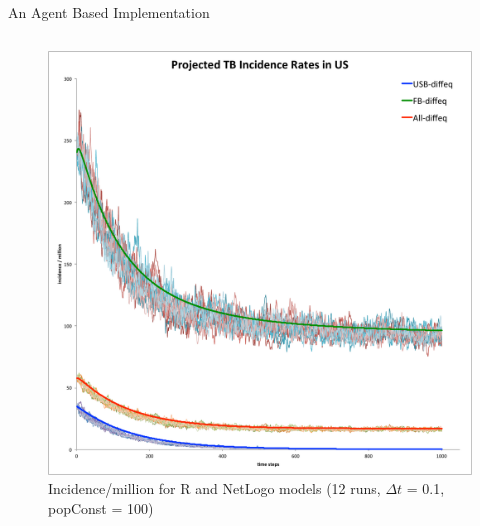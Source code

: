 \documentclass[final]{beamer}
\begin{document}
\begin{frame}
\begin{columns}
\begin{column}{.3\textwidth}
\begin{block}{An Agent Based Implementation}
\begin{block}{}
\begin{column}{.45\textwidth}
            \begin{figure}[h]
              \begin{center}
                \includegraphics[width=\textwidth]{NLHMinc}
              \end{center}
              \caption{Incidence/million for R and NetLogo models (12 runs, $\Delta t$ = 0.1, popConst = 100)}
              \label{fig:NLHMinc}
            \end{figure}
          \end{column}
          \begin{column}{.45\textwidth}
            \begin{figure}[h]
              \begin{center}

\end{center}
\end{figure}
\end{column}
\end{block}
\end{block}
\end{column}
\end{columns}
\end{frame}
\end{document}
